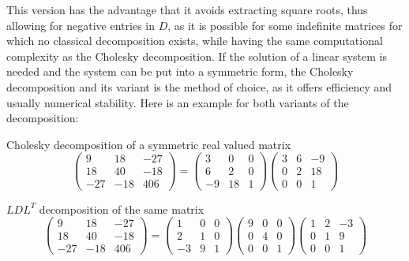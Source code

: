 \noindent This version has the advantage that it avoids extracting
square roots, thus allowing for negative entries in $D$, as it is
possible for some indefinite matrices for which no classical
decomposition exists, while having the same computational complexity as
the Cholesky decomposition. If the solution of a linear system is needed
and the system can be put into a symmetric form, the Cholesky
decomposition and its variant is the method of choice, as it offers
efficiency and usually numerical stability. Here is an example for both
variants of the decomposition:\\
\begin{inparaenum}[]
  \item Cholesky decomposition of a symmetric real valued matrix
  \begin{equation}
    \begin{pmatrix}
      9 & 18 & -27\\
      18 & 40 & -18 \\
      -27 & -18 & 406
    \end{pmatrix}
    =
    \begin{pmatrix}
      3 & 0 & 0\\
      6 & 2 & 0 \\
      -9 & 18 & 1
    \end{pmatrix}
    \begin{pmatrix}
      3 & 6 & -9\\
      0 & 2 & 18 \\
      0 & 0 & 1
    \end{pmatrix}
  \end{equation}
  \item $LDL^T$ decomposition of the same matrix
  \begin{equation}
    \begin{pmatrix}
      9 & 18 & -27\\
      18 & 40 & -18 \\
      -27 & -18 & 406
    \end{pmatrix}
    =
    \begin{pmatrix}
      1 & 0 & 0\\
      2 & 1 & 0 \\
      -3 & 9 & 1
    \end{pmatrix}
    \begin{pmatrix}
      9 & 0 & 0\\
      0 & 4 & 0 \\
      0 & 0 & 1
    \end{pmatrix}
    \begin{pmatrix}
      1 & 2 & -3\\
      0 & 1 & 9 \\
      0 & 0 & 1
    \end{pmatrix}
  \end{equation}
\end{inparaenum}

